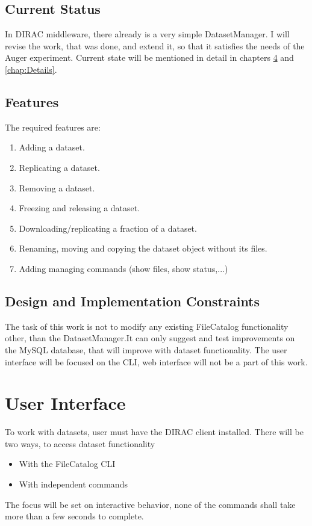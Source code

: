 \documentclass{scrreprt}
\begin{document}
\section{Current Status}

In DIRAC middleware, there already is a very simple DatasetManager. I will revise the work, that was done, and extend it, so that it satisfies the needs of the Auger experiment. Current state will be mentioned in detail in chapters \ref{chap:UI} and \ref{chap:Details}. 


\section{Features}

The required features are:

\begin{enumerate}
\item Adding a dataset.
\item Replicating a dataset.
\item Removing a dataset.
\item Freezing and releasing a dataset.
\item Downloading/replicating a fraction of a dataset.
\item Renaming, moving and copying the dataset object without its files.
\item Adding managing commands (show files, show status,...)
\end{enumerate}


\section{Design and Implementation Constraints}
The task of this work is not to modify any existing FileCatalog functionality other, than the DatasetManager.It can only suggest and test improvements on the MySQL database, that will improve with dataset functionality. The user interface will be focused on the CLI, web interface will not be a part of this work.


\chapter{User Interface} \label{chap:UI}
To work with datasets, user must have the DIRAC client installed. There will be two ways, to access dataset functionality
\begin{itemize}
\item With the FileCatalog CLI
\item With independent commands
\end{itemize}
The focus will be set on interactive behavior, none of the commands shall take more than a few seconds to complete. 
\end{document}
